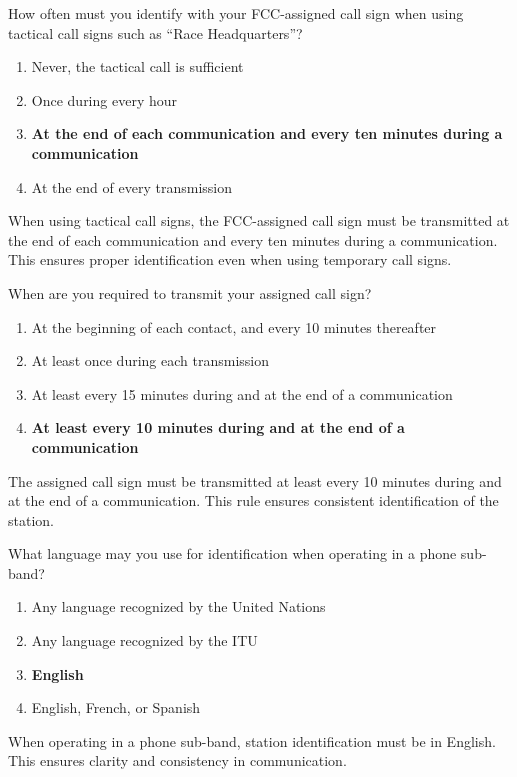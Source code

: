 
\begin{tcolorbox}[colback=gray!10!white,colframe=black!75!black,title={T1F02}]
    How often must you identify with your FCC-assigned call sign when using tactical call signs such as “Race Headquarters”?
    \begin{enumerate}[label=\Alph*),noitemsep]
        \item Never, the tactical call is sufficient
        \item Once during every hour
        \item \textbf{At the end of each communication and every ten minutes during a communication}
        \item At the end of every transmission
    \end{enumerate}
\end{tcolorbox}
When using tactical call signs, the FCC-assigned call sign must be transmitted at the end of each communication and every ten minutes during a communication. This ensures proper identification even when using temporary call signs.


\begin{tcolorbox}[colback=gray!10!white,colframe=black!75!black,title={T1F03}]
    When are you required to transmit your assigned call sign?
    \begin{enumerate}[label=\Alph*),noitemsep]
        \item At the beginning of each contact, and every 10 minutes thereafter
        \item At least once during each transmission
        \item At least every 15 minutes during and at the end of a communication
        \item \textbf{At least every 10 minutes during and at the end of a communication}
    \end{enumerate}
\end{tcolorbox}
The assigned call sign must be transmitted at least every 10 minutes during and at the end of a communication. This rule ensures consistent identification of the station.


\begin{tcolorbox}[colback=gray!10!white,colframe=black!75!black,title={T1F04}]
    What language may you use for identification when operating in a phone sub-band?
    \begin{enumerate}[label=\Alph*),noitemsep]
        \item Any language recognized by the United Nations
        \item Any language recognized by the ITU
        \item \textbf{English}
        \item English, French, or Spanish
    \end{enumerate}
\end{tcolorbox}
When operating in a phone sub-band, station identification must be in English. This ensures clarity and consistency in communication.

